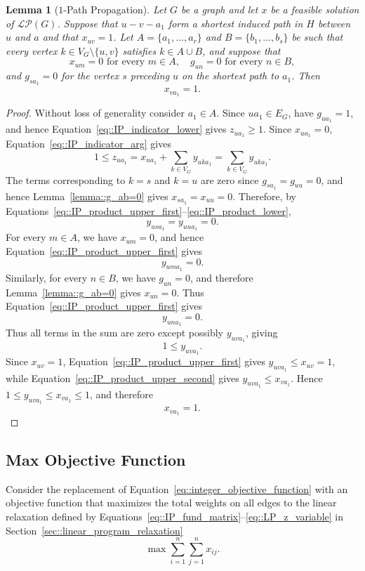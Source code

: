 \documentclass[11pt]{article}
\newtheorem{lemma}{Lemma}
\begin{document}
\begin{lemma}[$1$-Path Propagation] \label{lemma::1_path_propagation}
  Let $G$ be a graph and let $x$ be a feasible solution of $\mathcal{LP}(G)$. Suppose that $u-v-a_1$ form a shortest induced path in $H$ between $u$ and $a$ and that $x_{uv}=1$. Let $A=\{a_1,\ldots,a_r\}$ and $B=\{b_1,\ldots,b_s\}$ be such that every vertex $k \in V_G\setminus\{u,v\}$ satisfies
  $k \in A\cup B$, and suppose that 
  \[
  x_{um}=0 \text{ for every } m \in A, \quad g_{un}=0 \text{ for every } n \in B,
  \]
  and $g_{sa_1}=0$ for the vertex $s$ preceding $u$ on the shortest path to $a_1$. Then
  \[
  x_{va_1}=1.
  \]
\end{lemma}
\begin{proof}
  Without loss of generality consider $a_1\in A$. Since $ua_1\in E_G$, have $g_{ua_1}=1$, and hence Equation~\eqref{eq::IP_indicator_lower} gives $z_{ua_1}\geq1$. Since $x_{ua_1}=0$, Equation~\eqref{eq::IP_indicator_arg} gives
  \[
  1 \leq z_{ua_1} = x_{ua_1}+\sum_{k\in V_G}y_{uka_1} = \sum_{k\in V_G}y_{uka_1}.
  \]
  The terms corresponding to $k=s$ and $k=u$ are zero since $g_{sa_1}=g_{uu}=0$, and hence Lemma~\eqref{lemma::g_ab=0} gives $x_{sa_1}=x_{uu}=0$. Therefore, by Equations~\eqref{eq::IP_product_upper_first}--\eqref{eq::IP_product_lower},
  \[
  y_{usa_1}=y_{uua_1}=0.
  \]
  For every $m\in A$, we have $x_{um}=0$, and hence Equation~\eqref{eq::IP_product_upper_first} gives
  \[
  y_{uma_1}=0.
  \]
  Similarly, for every $n\in B$, we have $g_{un}=0$, and therefore Lemma~\eqref{lemma::g_ab=0} gives $x_{un}=0$. Thus Equation~\eqref{eq::IP_product_upper_first} gives
  \[
  y_{una_1}=0.
  \]
  Thus all terms in the sum are zero except possibly $y_{uva_1}$, giving
  \[
  1 \leq y_{uva_1}.
  \]
  Since $x_{uv}=1$, Equation~\eqref{eq::IP_product_upper_first} gives $y_{uva_1}\leq x_{uv}=1$, while Equation~\eqref{eq::IP_product_upper_second} gives $y_{uva_1} \leq x_{va_1}$. Hence $1 \leq y_{uva_1} \leq x_{va_1} \leq 1$, and therefore
  \[
  x_{va_1}=1.
  \]
\end{proof}

\subsection{Max Objective Function} \label{subsec::max_obj}

Consider the replacement of Equation~\ref{eq::integer_objective_function} with an objective function that maximizes the total weights on all edges to the linear relaxation defined by Equations~\eqref{eq::IP_fund_matrix}--\eqref{eq::LP_z_variable} in Section~\ref{sec::linear_program_relaxation} 
\begin{equation} \label{eq::max_obj_function}
  \max \sum_{i=1}^{n} \sum_{j=1}^{n} x_{ij}.
\end{equation}
\end{document}
